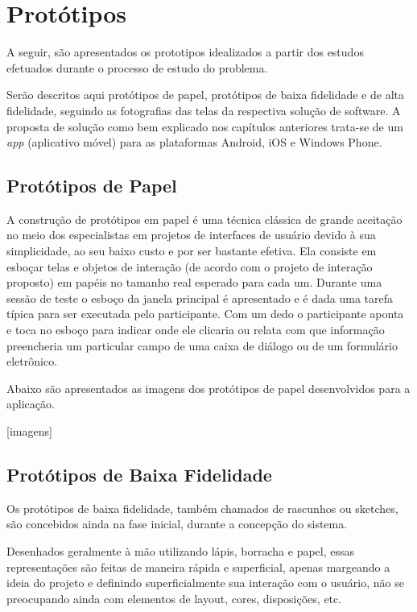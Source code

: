\chapter[Protótipos]{Protótipos}
\label{chap:prototipos}

	A seguir, são apresentados os prototipos idealizados a partir dos estudos efetuados durante o processo de estudo do problema.
	
	Serão descritos aqui protótipos de papel, protótipos de baixa fidelidade e de alta fidelidade, seguindo as fotografias das telas da respectiva solução de software. A proposta de solução como bem explicado nos capítulos anteriores trata-se de um \emph{app} (aplicativo móvel) para as plataformas Android, iOS e Windows Phone.

	\section[Protótipos de Papel]{Protótipos de Papel}
	\label{sec:prototipos_papel}

		A construção de protótipos em papel é uma técnica clássica de grande aceitação no meio dos especialistas em projetos de interfaces de usuário devido à sua simplicidade, ao seu baixo custo e por ser bastante efetiva. Ela consiste em esboçar telas e objetos de interação (de acordo com o projeto de interação proposto) em papéis no tamanho real esperado para cada um. Durante uma sessão de teste o esboço da janela principal é apresentado e é dada uma tarefa típica para ser executada pelo participante. Com um dedo o participante aponta e toca no esboço para indicar onde ele clicaria ou relata com que informação preencheria um particular campo de uma caixa de diálogo ou de um formulário eletrônico.

		Abaixo são apresentados as imagens dos protótipos de papel desenvolvidos para a aplicação.

		\newpage

		[imagens]

	\section[Protótipos de Baixa Fidelidade]{Protótipos de Baixa Fidelidade}
	\label{sec:prototipos_baixa}

		Os protótipos de baixa fidelidade, também chamados de rascunhos ou sketches, são concebidos ainda na fase inicial, durante a concepção do sistema.
		
		Desenhados geralmente à mão utilizando lápis, borracha e papel, essas representações são feitas de maneira rápida e superficial, apenas margeando a ideia do projeto e definindo superficialmente sua interação com o usuário, não se preocupando ainda com elementos de layout, cores, disposições, etc.

